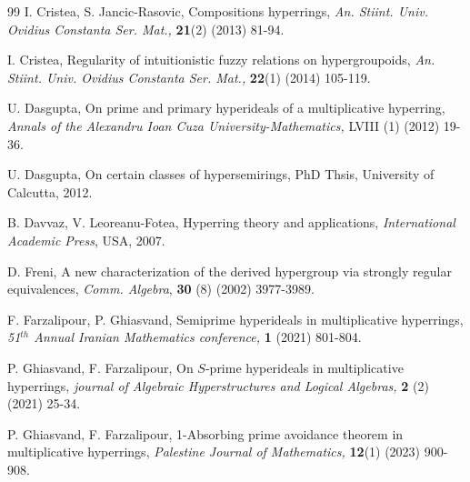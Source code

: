 \documentclass[preprint,review,10pt]{amsart}
\theoremstyle{definition}
\theoremstyle{remark}
\numberwithin{equation}{section}
\begin{document}
\begin{thebibliography}{99}
I. Cristea, S. Jancic-Rasovic, Compositions hyperrings, {\it An. Stiint. Univ. Ovidius Constanta Ser. Mat.,} {\bf 21}(2) (2013) 81-94.

I. Cristea, Regularity of intuitionistic fuzzy relations on hypergroupoids, {\it An. Stiint. Univ. Ovidius Constanta Ser. Mat.,} {\bf 22}(1) (2014)
105-119.

U. Dasgupta, On prime and primary hyperideals of a multiplicative hyperring, {\it Annals of the Alexandru Ioan Cuza
University-Mathematics,} LVIII (1) (2012) 19-36.

U. Dasgupta, On certain classes of hypersemirings, PhD Thsis, University of
Calcutta, 2012.




B. Davvaz, V. Leoreanu-Fotea, Hyperring theory and applications, {\it International Academic
Press}, USA, 2007.
  





D. Freni, A new characterization of the derived hypergroup via strongly
regular equivalences, {\it Comm. Algebra}, {\bf 30} (8) (2002) 3977-3989.
 

 
F. Farzalipour, P. Ghiasvand, Semiprime hyperideals in multiplicative hyperrings, {\it 51$^{th}$ Annual Iranian Mathematics conference,} {\bf 1} (2021) 801-804.
 

 
P. Ghiasvand, F. Farzalipour, On $S$-prime hyperideals in multiplicative hyperrings, {\it journal of Algebraic Hyperstructures
and Logical Algebras,} {\bf 2} (2) (2021) 25-34.


P. Ghiasvand, F. Farzalipour, 1-Absorbing prime avoidance theorem  in multiplicative hyperrings, {\it  Palestine Journal of Mathematics,} {\bf 12}(1) (2023) 900-908.
 

\end{thebibliography}
\end{document}
